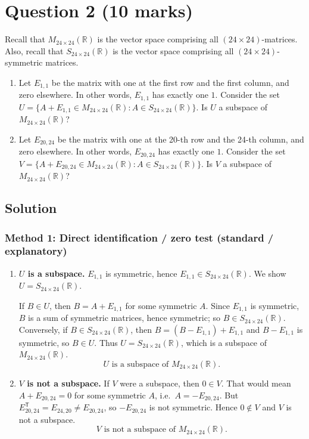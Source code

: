 \documentclass[12pt]{article}
\let\amsboxed\boxed
\renewcommand{\boxed}[1]{\amsboxed{\,#1\,}}
\begin{document}
\newpage

\section{Question 2 \hfill (10 marks)}
Recall that $M_{24\times 24}(\mathbb{R})$ is the vector space comprising all $(24\times 24)$-matrices. Also, recall that $S_{24\times 24}(\mathbb{R})$
is the vector space comprising all $(24 \times 24)$-symmetric matrices.
\begin{enumerate}[label=(\alph*)]
\item Let $E_{1,1}$ be the matrix with one at the first row and the first column, and zero elsewhere. In other words, $E_{1,1}$ has exactly one $1$.
Consider the set $U = \{A + E_{1,1} \in M_{24\times 24}(\mathbb{R}) : A \in S_{24\times 24}(\mathbb{R}) \}$. Is $U$ a subspace of $M_{24\times 24}(\mathbb{R})$?
\item Let $E_{20,24}$ be the matrix with one at the 20-th row and the 24-th column, and zero elsewhere. In other words, $E_{20,24}$ has exactly one $1$.
Consider the set $V = \{A + E_{20,24} \in M_{24\times 24}(\mathbb{R}) : A \in S_{24\times 24}(\mathbb{R}) \}$. Is $V$ a subspace of $M_{24\times 24}(\mathbb{R})$?
\end{enumerate}
\bigskip
\subsection{Solution}

\subsubsection{Method 1: Direct identification / zero test (standard / explanatory)}
\begin{enumerate}[label=(\alph*)]
\item \textbf{$U$ is a subspace.}
$E_{1,1}$ is symmetric, hence $E_{1,1}\in S_{24\times 24}(\mathbb{R})$. We show $U=S_{24\times 24}(\mathbb{R})$.

If $B\in U$, then $B=A+E_{1,1}$ for some symmetric $A$. Since $E_{1,1}$ is symmetric, $B$ is a sum of symmetric matrices, hence symmetric; so $B\in S_{24\times 24}(\mathbb{R})$.
Conversely, if $B\in S_{24\times 24}(\mathbb{R})$, then $B=(B-E_{1,1})+E_{1,1}$ and $B-E_{1,1}$ is symmetric, so $B\in U$.
Thus $U=S_{24\times 24}(\mathbb{R})$, which is a subspace of $M_{24\times 24}(\mathbb{R})$.
\[
\boxed{\,U\text{ is a subspace of }M_{24\times 24}(\mathbb{R}).\,}
\]

\item \textbf{$V$ is not a subspace.}
If $V$ were a subspace, then $0\in V$. That would mean $A+E_{20,24}=0$ for some symmetric $A$, i.e.\ $A=-E_{20,24}$.
But $E_{20,24}^{\mathsf T}=E_{24,20}\neq E_{20,24}$, so $-E_{20,24}$ is not symmetric. Hence $0\notin V$ and $V$ is not a subspace.
\[
\boxed{\,V\text{ is not a subspace of }M_{24\times 24}(\mathbb{R}).\,}
\]
\end{enumerate}
\bigskip
\end{document}
